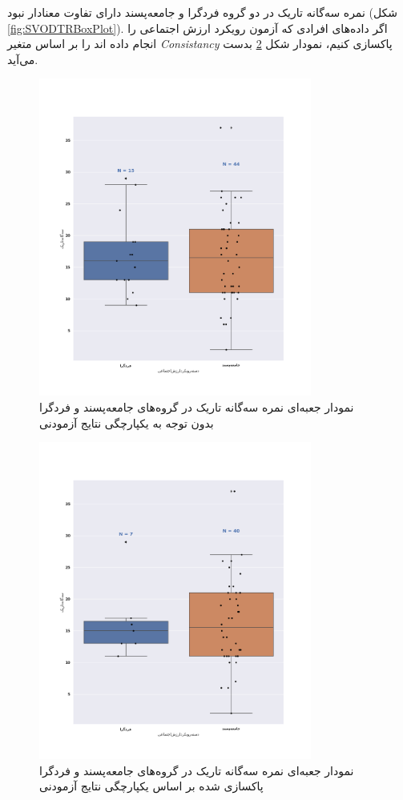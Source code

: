 نمره سه‌گانه تاریک در دو گروه  فرد‌گرا و جامعه‌پسند دارای تفاوت معنادار نبود
(شکل
\ref{fig:SVODTRBoxPlot}).
اگر داده‌های افرادی که آزمون رویکرد ارزش اجتماعی را انجام داده اند را بر اساس متغیر 
\textit{\gls{Consistancy}}
پاکسازی کنیم، نمودار شکل 
\ref{fig:SVODTRBoxPlotIsConsistantOn}
بدست می‌آید.
\begin{figure}[htpb]
    \centering
    \includegraphics[width=0.8\textwidth]{./img/SVODTRBoxPlotIsConsistantOff.png}
    \caption{نمودار جعبه‌ای نمره سه‌گانه تاریک در گروه‌های جامعه‌پسند و فرد‌گرا بدون توجه به یکپارچگی نتایج آزمودنی} 
    \label{fig:SVODTRBoxPlotIsConsistantOff}
\end{figure}
\begin{figure}[htpb]
    \centering
    \includegraphics[width=0.8\textwidth]{./img/SVODTRBoxPlotIsConsistantOn.png}
    \caption{نمودار جعبه‌ای نمره سه‌گانه تاریک در گروه‌های جامعه‌پسند و فرد‌گرا پاکسازی شده بر اساس یکپارچگی نتایج آزمودنی}
    \label{fig:SVODTRBoxPlotIsConsistantOn}
\end{figure}
